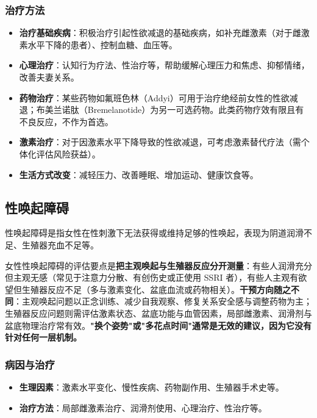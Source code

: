 \subsubsection{治疗方法}

\begin{itemize}
\item \textbf{治疗基础疾病}：积极治疗引起性欲减退的基础疾病，如补充雌激素（对于雌激素水平下降的患者）、控制血糖、血压等。
\item \textbf{心理治疗}：认知行为疗法、性治疗等，帮助缓解心理压力和焦虑、抑郁情绪，改善夫妻关系。
\item \textbf{药物治疗}：某些药物如氟班色林（Addyi）可用于治疗绝经前女性的性欲减退；布美兰诺肽（Bremelanotide）为另一可选药物。此类药物疗效有限且有不良反应，不作为首选。
\item \textbf{激素治疗}：对于因激素水平下降导致的性欲减退，可考虑激素替代疗法（需个体化评估风险获益）。
\item \textbf{生活方式改变}：减轻压力、改善睡眠、增加运动、健康饮食等。
\end{itemize}

\subsection{性唤起障碍}

性唤起障碍是指女性在性刺激下无法获得或维持足够的性唤起，表现为阴道润滑不足、生殖器充血不足等。

女性性唤起障碍的评估要点是\textbf{把主观唤起与生殖器反应分开测量}：有些人润滑充分但主观无感（常见于注意力分散、有创伤史或正使用 SSRI 者），有些人主观有欲望但生殖器反应不足（多与激素变化、盆底血流或药物相关）。\textbf{干预方向随之不同}：主观唤起问题以正念训练、减少自我观察、修复关系安全感与调整药物为主；生殖器反应问题则需评估激素状态、盆底功能与血管因素，局部雌激素、润滑剂与盆底物理治疗常有效。\textbf{"换个姿势"或"多花点时间"通常是无效的建议，因为它没有针对任何一层机制。}

\subsubsection{病因与治疗}

\begin{itemize}
\item \textbf{生理因素}：激素水平变化、慢性疾病、药物副作用、生殖器手术史等。
\item \textbf{治疗方法}：局部雌激素治疗、润滑剂使用、心理治疗、性治疗等。
\end{itemize}

